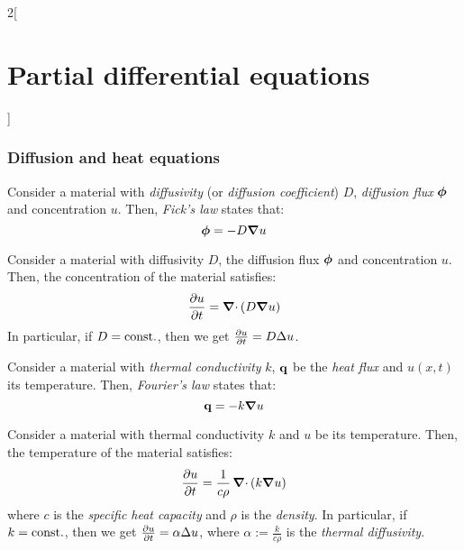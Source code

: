 \documentclass[../../../main_math.tex]{subfiles}
\begin{document}
\begin{multicols}{2}[\section{Partial differential equations}]
  \subsubsection{Diffusion and heat equations}
  \begin{proposition}
    Consider a material with \emph{diffusivity} (or \emph{diffusion coefficient}) $D$, \emph{diffusion flux} $\boldsymbol{\mathrm{\phi}}$ and concentration $u$. Then, \emph{Fick's law} states that: $$\boldsymbol{\mathrm{\phi}}=-D\grad{u}$$
  \end{proposition}
  \begin{proposition}
    Consider a material with diffusivity $D$, the diffusion flux $\boldsymbol{\mathrm{\phi}}$ and concentration $u$. Then, the concentration of the material satisfies: $$\pdv{u}{t}=\operatorname{\boldsymbol{\mathrm{\nabla}}\cdot}\left(D\grad{u}\right)$$
    In particular, if $D=\text{const.}$, then we get $\pdv{u}{t}=D\Delta{u}$.
  \end{proposition}
  \begin{proposition}
    Consider a material with \emph{thermal conductivity} $k$, $\boldsymbol{\mathrm{q}}$ be the \emph{heat flux} and $u(x,t)$ its temperature. Then, \emph{Fourier's law} states that: $$\boldsymbol{\mathrm{q}}=-k\grad{u}$$
  \end{proposition}
  \begin{proposition}
    Consider a material with thermal conductivity $k$ and $u$ be its temperature. Then, the temperature of the material satisfies: $$\pdv{u}{t}=\frac{1}{c\rho}\operatorname{\boldsymbol{\mathrm{\nabla}}\cdot}\left(k\grad{u}\right)$$
    where $c$ is the \emph{specific heat capacity} and $\rho$ is the \emph{density}. In particular, if $k=\text{const.}$, then we get $\pdv{u}{t}=\alpha\Delta{u}$, where $\alpha:=\frac{k}{c\rho}$ is the \emph{thermal diffusivity}.
  \end{proposition}

\end{multicols}
\end{document}
